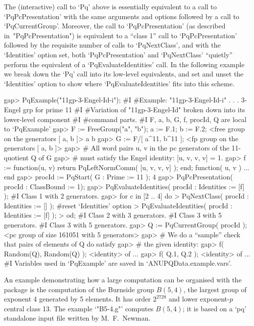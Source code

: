 The (interactive) call to `Pq'  above is essentially equivalent to a call
to `PqPcPresentation' with  the same arguments and options  followed by a
call to  `PqCurrentGroup'. Moreover,  the call to  `PqPcPresentation' (as
described in~"PqPcPresentation")  is equivalent to a ``class  1'' call to
`PqPcPresentation'  followed   by  the  requisite  number   of  calls  to
`PqNextClass',   and    with   the   `Identities'    option   set,   both
`PqPcPresentation' and  `PqNextClass' ``quietly'' perform  the equivalent
of a `PqEvaluateIdentities' call. In  the following example we break down
the  `Pq' call  into its  low-level equivalents,  and set  and  unset the
`Identities' option  to show where `PqEvaluateIdentities'  fits into this
scheme.

\begintt
gap> PqExample("11gp-3-Engel-Id-i");
#I  #Example: "11gp-3-Engel-Id-i" . . . 3-Engel grp for prime 11
#I  #Variation of "11gp-3-Engel-Id" broken down into its lower-level component
#I  #command parts.
#I  F, a, b, G, f, procId, Q are local to `PqExample'
gap> F := FreeGroup("a", "b"); a := F.1; b := F.2;
<free group on the generators [ a, b ]>
a
b
gap> G := F/[ a^11, b^11 ];
<fp group on the generators [ a, b ]>
gap> # All word pairs u, v in the pc generators of the 11-quotient Q of G 
gap> # must satisfy the Engel identity: [u, v, v, v] = 1.
gap> f := function(u, v) return PqLeftNormComm( [u, v, v, v] ); end;
function( u, v ) ... end
gap> procId := PqStart( G : Prime := 11 );
4
gap> PqPcPresentation( procId : ClassBound := 1);
gap> PqEvaluateIdentities( procId : Identities := [f] );
#I  Class 1 with 2 generators.
gap> for c in [2 .. 4] do
>      PqNextClass( procId : Identities := [] ); #reset `Identities' option
>      PqEvaluateIdentities( procId : Identities := [f] );
>    od;
#I  Class 2 with 3 generators.
#I  Class 3 with 5 generators.
#I  Class 3 with 5 generators.
gap> Q := PqCurrentGroup( procId );
<pc group of size 161051 with 5 generators>
gap> # We do a ``sample'' check that pairs of elements of Q do satisfy
gap> # the given identity:
gap> f( Random(Q), Random(Q) );
<identity> of ...
gap> f( Q.1, Q.2 );
<identity> of ...
#I  Variables used in `PqExample' are saved in `ANUPQData.example.vars'.
\endtt


An example demonstrating how a large computation can be organised with the
{\ANUPQ} package  is the computation of the Burnside group $B(5, 4)$, the
largest  group of  exponent  4 generated  by  5 elements.   It has  order
$2^{2728}$  and   lower  exponent-$p$  central  class   13.  The  example
`"B5-4.g"' computes  $B(5, 4)$;  it is based  on a `pq'  standalone input
file written by M.~F.~Newman.

